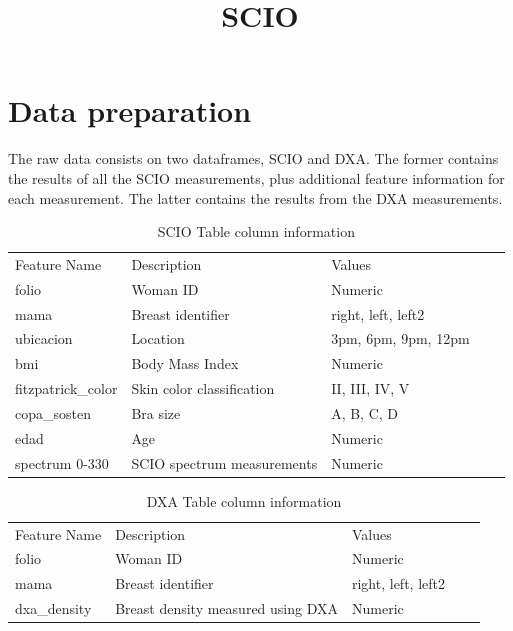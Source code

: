 \documentclass[letterpaper,11pt]{article}
\begin{document}
\title{SCIO}
\maketitle

\section*{Data preparation}
The raw data consists on two dataframes, SCIO and DXA. The former contains the results of all the SCIO measurements, plus additional feature information for each measurement. The latter contains the results from the DXA measurements. 

\begin{table}[h]
	\centering
	\begin{tabular}{l|l|lll}
		Feature Name       & Description                & Values                     &  &  \\ \cline{1-3}
		folio              & Woman ID                   & Numeric                    &  &  \\
		mama               & Breast identifier          & right, left, left2         &  &  \\
		ubicacion          & Location                   & 3pm, 6pm, 9pm, 12pm &  &  \\
		bmi                & Body Mass Index            & Numeric                   &  &  \\
		fitzpatrick\_color & Skin color classification  & II, III, IV, V             &  &  \\
		copa\_sosten       & Bra size                   & A, B, C, D                 &  &  \\
		edad               & Age                        & Numeric                    &  &  \\
		spectrum 0-330     & SCIO spectrum measurements & Numeric                    &  & 
	\end{tabular}
\caption{SCIO Table column information}
\end{table}

\begin{table}[h]
	\centering
	\begin{tabular}{l|l|lll}
		Feature Name       & Description                & Values                     &  &  \\ \cline{1-3}
		folio              & Woman ID                   & Numeric                    &  &  \\
		mama               & Breast identifier          & right, left, left2         &  &  \\
		dxa\_density          & Breast density measured using DXA                   & Numeric &  &  
	\end{tabular}
	\caption{DXA Table column information}
\end{table}
\end{document}
